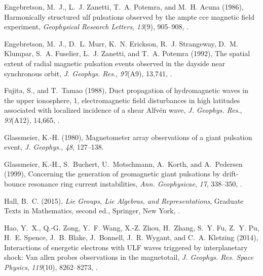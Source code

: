 \documentclass[draft,linenumbers]{agujournal}
\begin{document}
\begin{thebibliography}{50}
Engebretson, M.~J., L.~J. Zanetti, T.~A. Potemra, and M.~H. Acuna (1986),
  Harmonically structured ulf pulsations observed by the ampte cce magnetic
  field experiment, \textit{Geophysical Research Letters}, \textit{13}(9),
  905--908, .

Engebretson, M.~J., D.~L. Murr, K.~N. Erickson, R.~J. Strangeway, D.~M.
  Klumpar, S.~A. Fuselier, L.~J. Zanetti, and T.~A. Potemra (1992), The spatial
  extent of radial magnetic pulsation events observed in the dayside near
  synchronous orbit, \textit{J. Geophys. Res.}, \textit{97}(A9), 13,741,
  .

Fujita, S., and T.~Tamao (1988), Duct propagation of hydromagnetic waves in the
  upper ionosphere, 1, electromagnetic field disturbances in high latitudes
  associated with localized incidence of a shear {Alfv{\'e}n} wave, \textit{J.
  Geophys. Res.}, \textit{93}(A12), 14,665, .

Glassmeier, K.-H. (1980), Magnetometer array observations of a giant pulsation
  event, \textit{J. Geophys.}, \textit{48}, 127--138.

Glassmeier, K.-H., S.~Buchert, U.~Motschmann, A.~Korth, and A.~Pedersen (1999),
  Concerning the generation of geomagnetic giant pulsations by drift-bounce
  resonance ring current instabilities, \textit{Ann. Geophysicae}, \textit{17},
  338--350, .

Hall, B.~C. (2015), \textit{Lie Groups, Lie Algebras, and Representations},
  Graduate Texts in Mathematics, second ed., Springer, New York,
  .

Hao, Y.~X., Q.-G. Zong, Y.~F. Wang, X.-Z. Zhou, H.~Zhang, S.~Y. Fu, Z.~Y. Pu,
  H.~E. Spence, J.~B. Blake, J.~Bonnell, J.~R. Wygant, and C.~A. Kletzing
  (2014), Interactions of energetic electrons with {ULF} waves triggered by
  interplanetary shock: Van allen probes observations in the magnetotail,
  \textit{J. Geophys. Res. Space Physics}, \textit{119}(10), 8262--8273,
  .


\end{thebibliography}
\end{document}
